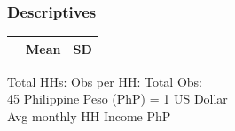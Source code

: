 \documentclass[aspectratio=149]{beamer}
\newcommand\Wider[2][3em]{%
\makebox[\linewidth][c]{%
  \begin{minipage}{\dimexpr\textwidth+#1\relax}
  \raggedright#2
  \end{minipage}%
  }%
}
\begin{document}
\begin{frame}
\frametitle{Descriptives}

% 
\begin{table}[H]
\centering
\vspace{-2mm}
\begin{tabular}{l*{1}{cc}}
 & Mean & SD  \\
\midrule

\end{tabular}
\end{table}

Total HHs:    \hspace{3mm} Obs per HH:   \hspace{3mm} Total Obs:  \\[.8em]
45 Philippine Peso (PhP) = 1 US Dollar \\
Avg monthly HH Income PhP \\

\end{frame}


\end{document}
